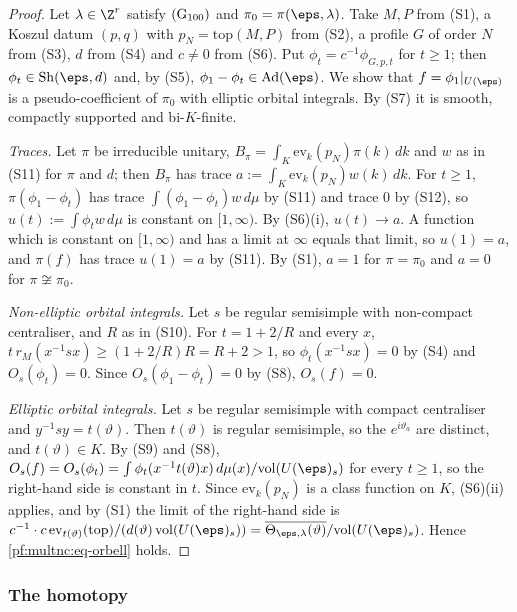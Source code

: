 \begin{proof}
Let $\lambda\in\Z^r$ satisfy $\textup{(G$_{100}$)}$ and $\pi_0=\pi(\eps,\lambda)$. Take $M,P$ from (S1), a Koszul datum
$(p,q)$ with $p_N=\mathrm{top}(M,P)$ from (S2), a profile $G$ of order $N$ from (S3), $d$ from (S4) and $c\ne0$ from (S6).
Put $\phi_t=c^{-1}\phi_{G,p,t}$ for $t\ge1$; then $\phi_t\in\mathrm{Sh}(\eps,d)$ and, by (S5), $\phi_1-\phi_t\in
\mathrm{Ad}(\eps)$. We show that $f=\phi_1|_{U(\eps)}$ is a pseudo-coefficient of $\pi_0$ with elliptic orbital integrals.
By (S7) it is smooth, compactly supported and bi-$K$-finite.

\emph{Traces.} Let $\pi$ be irreducible unitary, $B_\pi=\int_K\mathrm{ev}_k(p_N)\pi(k)\,dk$ and $w$ as in (S11) for $\pi$
and $d$; then $B_\pi$ has trace $a:=\int_K\mathrm{ev}_k(p_N)w(k)\,dk$. For $t\ge1$, $\pi(\phi_1-\phi_t)$ has trace
$\int(\phi_1-\phi_t)w\,d\mu$ by (S11) and trace $0$ by (S12), so $u(t):=\int\phi_tw\,d\mu$ is constant on $[1,\infty)$.
By (S6)(i), $u(t)\to a$. A function which is constant on $[1,\infty)$ and has a limit at $\infty$ equals that limit, so
$u(1)=a$, and $\pi(f)$ has trace $u(1)=a$ by (S11). By (S1), $a=1$ for $\pi=\pi_0$ and $a=0$ for $\pi\not\cong\pi_0$.

\emph{Non-elliptic orbital integrals.} Let $s$ be regular semisimple with non-compact centraliser, and $R$ as in (S10).
For $t=1+2/R$ and every $x$, $t\,r_M(x^{-1}sx)\ge(1+2/R)R=R+2>1$, so $\phi_t(x^{-1}sx)=0$ by (S4) and $O_s(\phi_t)=0$.
Since $O_s(\phi_1-\phi_t)=0$ by (S8), $O_s(f)=0$.

\emph{Elliptic orbital integrals.} Let $s$ be regular semisimple with compact centraliser and $y^{-1}sy=t(\vartheta)$.
Then $t(\vartheta)$ is regular semisimple, so the $e^{i\vartheta_a}$ are distinct, and $t(\vartheta)\in K$. By (S9) and
(S8), $O_s(f)=O_s(\phi_t)=\int\phi_t(x^{-1}t(\vartheta)x)\,d\mu(x)/\mathrm{vol}(U(\eps)_s)$ for every $t\ge1$, so the
right-hand side is constant in $t$. Since $\mathrm{ev}_k(p_N)$ is a class function on $K$, (S6)(ii) applies, and by (S1)
the limit of the right-hand side is $c^{-1}\cdot c\,\mathrm{ev}_{t(\vartheta)}(\mathrm{top})/(d(\vartheta)\,
\mathrm{vol}(U(\eps)_s))=\overline{\Theta_{\eps,\lambda}(\vartheta)}/\mathrm{vol}(U(\eps)_s)$. Hence
\eqref{pf:multnc:eq-orbell} holds.
\end{proof}

\subsubsection*{The homotopy}

